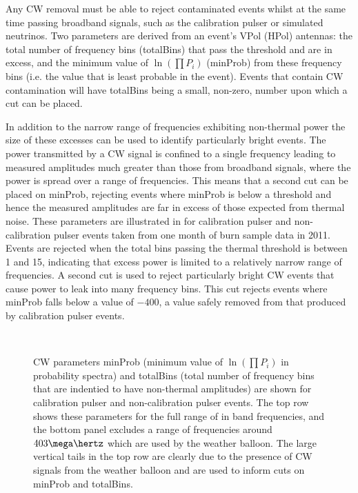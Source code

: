 Any CW removal must be able to reject contaminated events whilst at the same time passing broadband signals, such as the calibration pulser or simulated neutrinos. Two parameters are derived from an event's VPol (HPol) antennas: the total number of frequency bins (totalBins) that pass the threshold and are in excess, and the minimum value of $\ln(\prod P_{i})$ (minProb) from these frequency bins (i.e. the value that is least probable in the event). Events that contain CW contamination will have totalBins being a small, non-zero, number upon which a cut can be placed. 

In addition to the narrow range of frequencies exhibiting non-thermal power the size of these excesses can be used to identify particularly bright events. The power transmitted by a CW signal is confined to a single frequency leading to measured amplitudes much greater than those from broadband signals, where the power is spread over a range of frequencies. This means that a second cut can be placed on minProb, rejecting events where minProb is below a threshold and hence the measured amplitudes are far in excess of those expected from thermal noise. These parameters are illustrated in  for calibration pulser and non-calibration pulser events taken from one month of burn sample data in 2011. Events are rejected when the total bins passing the thermal threshold is between 1 and 15, indicating that excess power is limited to a relatively narrow range of frequencies. A second cut is used to reject particularly bright CW events that cause power to leak into many frequency bins. This cut rejects events where minProb falls below a value of $-400$, a value safely removed from that produced by calibration pulser events. 


\begin{figure}[htpb]
  \hfill
  \\
  \hfill
  \caption{CW parameters minProb (minimum value of $\ln(\prod P_{i})$ in probability spectra) and totalBins (total number of frequency bins that are indentied to have non-thermal amplitudes) are shown for calibration pulser and non-calibration pulser events. The top row shows these parameters for the full range of in band frequencies, and the bottom panel excludes a range of frequencies around $403 \mega \hertz$ which are used by the weather balloon. The large vertical tails in the top row are clearly due to the presence of CW signals from the weather balloon and are used to inform cuts on minProb and totalBins.}
  \label{fig:analysis:CWRemoval:Filtering:CW-MinProb-TotalBins}
\end{figure}


